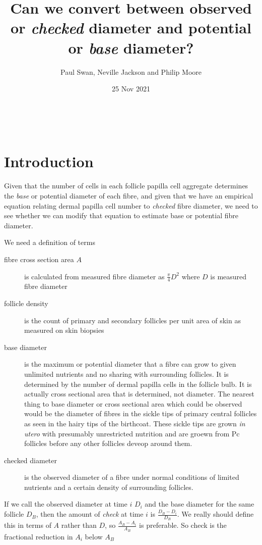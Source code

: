 \documentclass[titlepage]{article}  %
\title{Can we convert between observed or {\em checked} diameter and potential or {\em base} diameter?}
\author{Paul Swan, Neville Jackson and Philip Moore}
\date{25 Nov 2021}
\begin{document}
 


 
\maketitle      
\tableofcontents

$\newcommand{\E}{\mathrm{E}}$
$\newcommand{\Var}{\mathrm{Var}}$
$\newcommand{\Cov}{\mathrm{Cov}}$ 
$\newcommand{\SD}{\mathrm{SD}}$ 

\clearpage
\section{Introduction} 


Given that the number of cells in each follicle papilla cell aggregate determines the {\em base} or potential diameter of each fibre, and given that we have an empirical equation relating dermal papilla cell number to {\em checked} fibre diameter, we need to see whether we can modify that equation to estimate base or potential fibre diameter.

We need a definition of terms
\begin{description}
\item[fibre cross section area $A$] is calculated from measured fibre diameter as $\frac{\pi}{4}D^{2}$ where $D$  is measured fibre diameter
\item[follicle density] is the count of primary and secondary follicles per unit area of skin as measured on skin biopsies
\item[base diameter] is the maximum or potential diameter that a fibre can grow to given unlimited nutrients and no sharing with surrounding follicles. It is determined by the number of dermal papilla cells in the follicle bulb.  It is actually cross sectional area that is determined, not diameter.  The nearest thing to base diameter or cross sectional area which could be observed would be the diameter of fibres in the sickle tips of primary central follicles as seen in the hairy tips of the birthcoat. These sickle tips are grown {\em in utero} with presumably unrestricted nutrition and are groewn from Pc follicles before any other follicles deveop around them.
\item[checked diameter] is the observed diameter of a fibre under normal conditions of limited nutrients and a certain density of surrounding follicles. 
\end{description}
If we call the observed diameter at time $i$ $D_{i}$ and the base diameter for the same follicle $D_{B}$, then the amount of {\em check} at time $i$ is $\frac{D_{B} - D_{i}}{D_{B}}$. We really should define this in terms of $A$ rather than $D$, so $\frac{A_{B} - A_{i}}{A_{B}}$ is preferable. So check is the fractional reduction in $A_{i}$ below $A_{B}$
\end{document}
